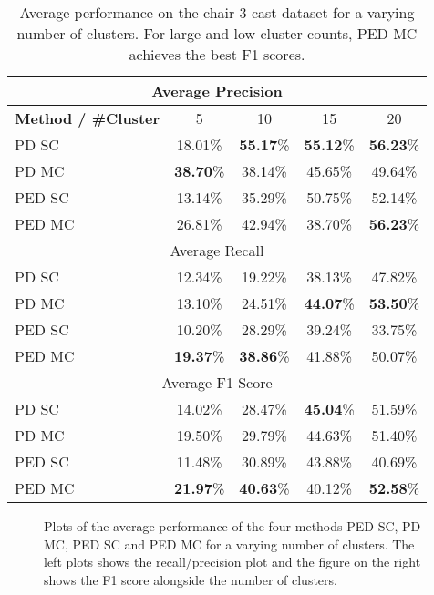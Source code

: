 \begin{table}[H]
\centering
\begin{tabular}{|l|c|c|c|c|}
\hline
\multicolumn{5}{|c|}{Average Precision} \\ \hline
\textbf{Method / \#Cluster} & 5 & 10 & 15 & 20 \\ \hline
PD SC & 18.01\% & \textbf{55.17}\% & \textbf{55.12}\% & \textbf{56.23}\% \\ \hline
PD MC & \textbf{38.70}\% & 38.14\% & 45.65\% & 49.64\% \\ \hline
PED SC & 13.14\% & 35.29\% & 50.75\% & 52.14\%  \\ \hline
PED MC & 26.81\% & 42.94\% & 38.70\% & \textbf{56.23}\% \\ \hline
\multicolumn{5}{|c|}{Average Recall} \\ \hline
PD SC & 12.34\% & 19.22\% & 38.13\% & 47.82\% \\ \hline
PD MC & 13.10\% & 24.51\% & \textbf{44.07}\% & \textbf{53.50}\% \\ \hline
PED SC & 10.20\% & 28.29\% & 39.24\% & 33.75\% \\ \hline
PED MC & \textbf{19.37}\% & \textbf{38.86}\% & 41.88\% & 50.07\% \\ \hline
\multicolumn{5}{|c|}{Average F1 Score} \\ \hline
PD SC & 14.02\% & 28.47\% & \textbf{45.04}\% & 51.59\% \\ \hline
PD MC & 19.50\% & 29.79\% & 44.63\% & 51.40\% \\ \hline
PED SC & 11.48\% & 30.89\% & 43.88\% & 40.69\% \\ \hline
PED MC & \textbf{21.97}\% & \textbf{40.63}\% & 40.12\% & \textbf{52.58}\% \\ \hline
\end{tabular}
\caption[Chair 3 Cast: Average Precision Scores]{Average performance on the chair 3 cast dataset for a varying number of clusters. For large and low cluster counts, PED MC achieves the best F1 scores.}
\label{tab:chair_3_cast_avg_performance}
\end{table}

\begin{figure}[H]
\begin{center}

\end{center}
\caption[Chair 3 Cast avg statistic plots]{Plots of the average performance of the four methods PED SC, PD MC, PED SC and PED MC for a varying number of clusters. The left plots shows the recall/precision plot and the figure on the right shows the F1 score alongside the number of clusters.}
\label{fig:chair_3_cast_plot_avg_stat}
\end{figure}

